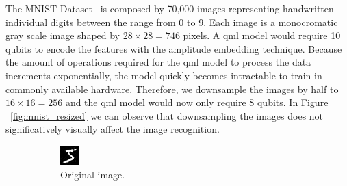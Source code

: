 The MNIST Dataset~\cite{bottou_comparison_1994} is composed by
70,000 images representing handwritten individual digits between
the range from \(0\) to \(9\). Each image is a monocromatic gray scale
image shaped by \(28 \times 28 = 746\) pixels. A \ac{qml} model would
require 10 qubits to encode the features with the amplitude embedding
technique. Because the amount of operations required for the
\ac{qml} model to process the data increments exponentially, the model
quickly becomes intractable to train in commonly available hardware.
Therefore, we downsample the images by half to \(16 \times 16 = 256\) and
the \ac{qml} model would now only require 8 qubits. In Figure
~\ref{fig:mnist_resized} we can observe that downsampling the images
does not significatively visually affect the image recognition. \

\begin{figure}
  \centering
  \begin{subfigure}{0.35\textwidth}
    \centering
    \includegraphics[width = \textwidth]{figures/reshaped.jpg}
    \caption{Original image.}
  \end{subfigure} \qquad \qquad
  \begin{subfigure}{0.35\textwidth}
    \centering

\end{subfigure}
\end{figure}
